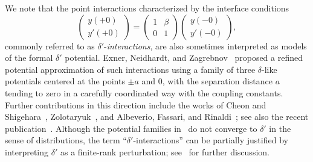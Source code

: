 \documentclass[reqno]{amsart}
\theoremstyle{definition}
\theoremstyle{remark}
\numberwithin{equation}{section}
\begin{document}
We note that the point interactions characterized by the interface conditions
\begin{equation*}
\begin{pmatrix}
  y(+0)\\ y'(+0)
\end{pmatrix}=
\begin{pmatrix}
  1& \beta\\
  0 & 1
\end{pmatrix}
\begin{pmatrix}
  y(-0)\\ y'(-0)
\end{pmatrix},
\end{equation*}
commonly referred to as $\delta'$-\textit{interactions}, are also sometimes interpreted as models of the formal $\delta'$ potential.
Exner, Neidhardt, and Zagrebnov~\cite{ExnerNeidhardtZagrebnov2001} proposed a refined potential approximation of such interactions using a family of three $\delta$-like potentials centered at the points $\pm a$ and $0$, with the separation distance $a$ tending to zero in a carefully coordinated way with the coupling constants.
Further contributions in this direction include the works of Cheon and Shigehara~\cite{CheonShigehara1998}, Zolotaryuk~\cite{ZolotaryukThreeDelta17}, and Albeverio, Fassari, and Rinaldi~\cite{FassariRinaldi2009,AlbeverioFassariRinaldi2013,AlbeverioFassariRinaldi2016}; see also the recent publication~\cite{FassariGadellaNietoRinaldi2024}.
Although the potential families in~\cite{ExnerNeidhardtZagrebnov2001} do not converge to $\delta'$ in the sense of distributions, the term ``$\delta'$-interactions'' can be partially justified by interpreting  $\delta'$ as a finite-rank perturbation; see~\cite{AlbeverioKoshmanenkoKurasovNizhnik2002, KuzhelNizhnik2006} for further discussion.
\end{document}
